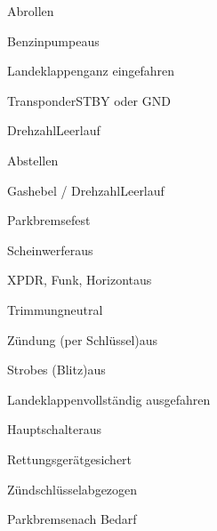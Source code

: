 \begin{checklist}{Abrollen}
	\item{Benzinpumpe}{aus}
	\item{Landeklappen}{ganz eingefahren}
	\item{Transponder}{STBY oder GND}
	\item{Drehzahl}{Leerlauf}
\end{checklist}

\begin{checklist}{Abstellen}
	  \item{Gashebel / Drehzahl}{Leerlauf}
	  \item{Parkbremse}{fest}
	  \item{Scheinwerfer}{aus}
	  \item{XPDR, Funk, Horizont}{aus}
	  \item{Trimmung}{neutral}
	  \item{Zündung (per Schlüssel)}{aus}
	  
	  \item{Strobes (Blitz)}{aus}
	  \item{Landeklappen}{vollständig ausgefahren}
	  \item{Hauptschalter}{aus}
	  \item{Rettungsgerät}{gesichert}
	  \item{Zündschlüssel}{abgezogen}
	  
	  \item{Parkbremse}{nach Bedarf}
\end{checklist}


